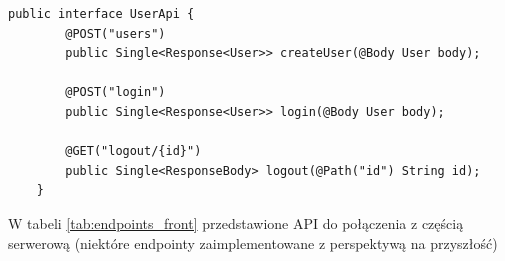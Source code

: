 \begin{lstlisting}[label=list:android_api_user,caption=Plik \texttt{main/java/com/example/testapp/api/api/UserApi.java},basicstyle=\tiny\ttfamily]
    public interface UserApi {
        @POST("users")
        public Single<Response<User>> createUser(@Body User body);
    
        @POST("login")
        public Single<Response<User>> login(@Body User body);
    
        @GET("logout/{id}")
        public Single<ResponseBody> logout(@Path("id") String id);
    }
\end{lstlisting}

W tabeli \ref{tab:endpoints_front} przedstawione API do połączenia z częścią serwerową (niektóre endpointy zaimplementowane z perspektywą na przyszłość)
